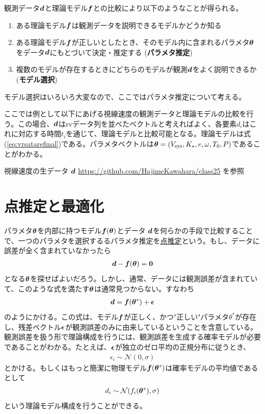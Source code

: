 観測データ$\boldsymbol{d}$と理論モデル$\boldsymbol{f}$との比較により以下のようなことが得られる。
\begin{enumerate}
\item ある理論モデル$\boldsymbol{f}$は観測データを説明できるモデルかどうか知る 
\item ある理論モデル$\boldsymbol{f}$が正しいとしたとき、そのモデル内に含まれるパラメタ$\boldsymbol{\theta}$をデータ$\boldsymbol{d}$にもとづいて決定・推定する ({\bf パラメタ推定})
\item 複数のモデルが存在するときにどちらのモデルが観測$\boldsymbol{d}$をよく説明できるか ({\bf モデル選択})
\end{enumerate}
モデル選択はいろいろ大変なので、ここではパラメタ推定について考える。



ここでは例として以下にあげる視線速度の観測データと理論モデルの比較を行う。この場合、$\boldsymbol{d}$はrvデータ列を並べたベクトルと考えればよく、各要素$d_i$はこれに対応する時間$t_i$を通じて、理論モデルと比較可能となる。理論モデルは式(\ref{eq:vrsatarefinal})である。パラメタベクトルは$\boldsymbol{\theta} = (V_\mathrm{sys}, K_\star, e, \omega, T_0, P)$であることがわかる。

\begin{itembox}{視線速度の生データ $\boldsymbol{d}$}
\footnotesize
\color{gray}
\href{https://github.com/HajimeKawahara/class25}{https://github.com/HajimeKawahara/class25}
を参照
\end{itembox}


\section{点推定と最適化}
パラメタ$\boldsymbol{\theta}$を内部に持つモデル$\boldsymbol{f}(\boldsymbol{\theta})$とデータ $\boldsymbol{d}$を何らかの手段で比較することで、一つのパラメタを選択するるパラメタ推定を\underline{点推定}という。もし、データに誤差が全く含まれていなかったら
\begin{align}
    \boldsymbol{d} - \boldsymbol{f}(\boldsymbol{\theta}) = \boldsymbol{0}
\end{align}
となる$\boldsymbol{\theta}$を探せばよいだろう。しかし、通常、データには観測誤差が含まれていて、このような式を満たす$\boldsymbol{\theta}$は通常見つからない。すなわち
\begin{align}
    \boldsymbol{d} = \boldsymbol{f}(\boldsymbol{\theta}^\ast) + \boldsymbol{\epsilon}
\end{align}
のようにかける。この式は、モデル$\boldsymbol{f}$が正しく、かつ"正しい"パラメタ$\theta^\ast$が存在し、残差ベクトル$\boldsymbol{\epsilon}$が観測誤差のみに由来しているということを含意している。観測誤差を扱う形で理論構成を行うには、観測誤差を生成する確率モデルが必要であることがわかる。たとえば、$\boldsymbol{\epsilon}$が独立のゼロ平均の正規分布に従うとき、
\begin{align}
 \epsilon_i \sim \mathcal{N}(0,\sigma) 
\end{align}
とかける。もしくはもっと簡潔に物理モデル$\boldsymbol{f}(\boldsymbol{\theta}^\ast)$は確率モデルの平均値であるとして
\begin{align}
    d_i \sim \mathcal{N} (f_i(\boldsymbol{\theta}^\ast), \sigma)
\end{align}
という理論モデル構成を行うことができる。

